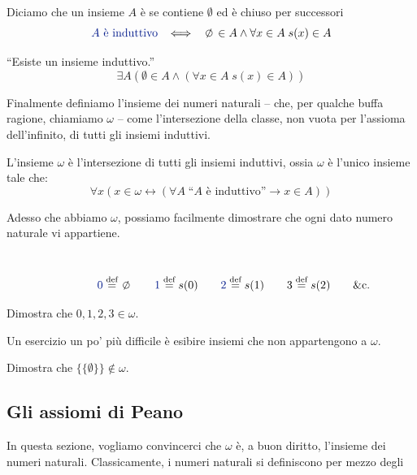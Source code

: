 \begin{definition}
	Diciamo che un insieme $A$ \`e  se contiene $\emptyset$ ed \`e chiuso per successori
	\[ \text{\drkblu$A$ \`e induttivo} \;\;\iff\;\; \emptyset \in A \land \forall {x \in A} \; s(x) \in A
		\]
\end{definition}

\begin{axiom}
	\label{ax7}
	``Esiste un insieme induttivo.''
	\[ \exists A (\emptyset \in A \land (\forall {x \in A} \; s(x) \in A))
		\]
\end{axiom}

Finalmente definiamo l'insieme dei numeri naturali -- che, per qualche buffa ragione, chiamiamo $\omega$ -- come l'intersezione della classe, non vuota per l'assioma dell'infinito,
di tutti gli insiemi induttivi.

\begin{definition}
	L'insieme $\omega$ \`e l'intersezione di tutti gli insiemi induttivi, ossia $\omega$ \`e l'unico insieme tale che:
	\[ \forall x (x \in \omega \leftrightarrow(\forall A \; \text{``$A$ \`e induttivo''}\rightarrow x \in A))
		\]
\end{definition}

Adesso che abbiamo $\omega$, possiamo facilmente dimostrare che ogni dato numero naturale vi appartiene.

\begin{definition}
\ 
\baselineskip
	\[ \qquad\qquad {\drkblu 0} \Mydef \emptyset \qquad {\drkblu 1} \Mydef s(0) \qquad {\drkblu 2} \Mydef s(1) \qquad {\drkblu}3 \Mydef s(2) \qquad \text{\etc.}
		\]
\end{definition}

\begin{exercise}
	Dimostra che $0,1,2,3 \in \omega$.
\end{exercise}

Un esercizio un po' pi\`u difficile \`e esibire insiemi che non appartengono a $\omega$.

\begin{exercise}
	Dimostra che $\{\{\emptyset\}\} \not \in \omega$.
\end{exercise}

\subsection{Gli assiomi di Peano}

In questa sezione, vogliamo convincerci 
che $\omega$ \`e, a buon diritto, l'insieme dei numeri naturali.
Classicamente, i numeri naturali si definiscono per mezzo degli

